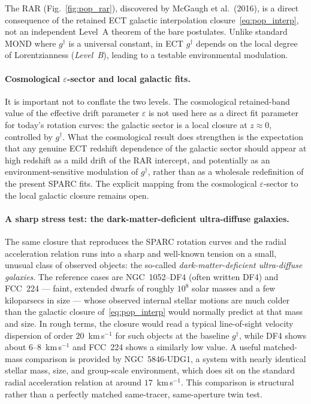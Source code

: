 \documentclass[11pt,a4paper]{article}
\begin{document}
The RAR (Fig.~\ref{fig:pop_rar}), discovered by McGaugh et al.\ (2016), is a direct consequence of the retained ECT galactic interpolation closure~\eqref{eq:pop_interp}, not an independent Level~A theorem of the bare postulates. Unlike standard MOND where $g^\dagger$ is a universal constant, in ECT $g^\dagger$ depends on the local degree of Lorentzianness (\emph{Level~B}), leading to a testable environmental modulation.

\paragraph{Cosmological $\varepsilon$-sector and local galactic fits.}
It is important not to conflate the two levels. The cosmological retained-band value of the effective drift parameter $\varepsilon$ is not used here as a direct fit parameter for today's rotation curves: the galactic sector is a local closure at $z\!\approx\!0$, controlled by $g^\dagger$. What the cosmological result does strengthen is the expectation that any genuine ECT redshift dependence of the galactic sector should appear at high redshift as a mild drift of the RAR intercept, and potentially as an environment-sensitive modulation of $g^\dagger$, rather than as a wholesale redefinition of the present SPARC fits. The explicit mapping from the cosmological $\varepsilon$-sector to the local galactic closure remains open.

\paragraph{A sharp stress test: the dark-matter-deficient ultra-diffuse galaxies.}
The same closure that reproduces the SPARC rotation curves and the radial acceleration relation runs into a sharp and well-known tension on a small, unusual class of observed objects: the so-called \emph{dark-matter-deficient ultra-diffuse galaxies}. The reference cases are NGC~1052--DF4 (often written DF4) and FCC~224 --- faint, extended dwarfs of roughly $10^8$ solar masses and a few kiloparsecs in size --- whose observed internal stellar motions are much colder than the galactic closure of~\eqref{eq:pop_interp} would normally predict at that mass and size. In rough terms, the closure would read a typical line-of-sight velocity dispersion of order $20$~km\,s$^{-1}$ for such objects at the baseline $g^\dagger$, while DF4 shows about $6$--$8$~km\,s$^{-1}$ and FCC~224 shows a similarly low value. A useful matched-mass comparison is provided by NGC~5846-UDG1, a system with nearly identical stellar mass, size, and group-scale environment, which does sit on the standard radial acceleration relation at around $17$~km\,s$^{-1}$. This comparison is structural rather than a perfectly matched same-tracer, same-aperture twin test.
\end{document}
